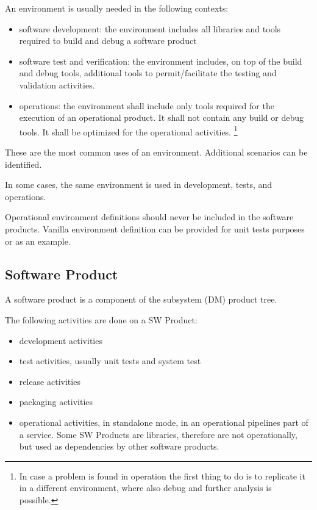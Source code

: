 An environment is usually needed in the following contexts:

\begin{itemize}
\item software development: the environment includes all libraries and tools required to build and debug a software product
\item software test and verification: the environment includes, on top of the build and debug tools, additional tools to permit/facilitate the testing and validation activities.
\item operations: the environment shall include only tools required for the execution of an operational product. It shall not contain any build or debug tools. It shall be optimized for the operational activities. \footnote{In case a problem is found in operation the first thing to do is to replicate it in a different environment, where also debug and further analysis is possible.}
\end{itemize}

These are the most common uses of an environment. Additional scenarios can be identified.

In some cases, the same environment is used in development, tests, and operations.

Operational environment definitions should never be included in the software products.
Vanilla environment definition can be provided for unit tests purposes or as an example.


\subsection{Software Product} \label{sec:swprod}

A software product is a component of the subsystem (DM) product tree.

The following activities are done on a SW Product:
\begin{itemize}
\item development activities
\item test activities, usually unit tests and system test
\item release activities
\item packaging activities
\item operational activities, in standalone mode, in an operational pipelines part of a service. Some SW Products are libraries, therefore are not operationally, but used as dependencies by other software products.
\end{itemize}

